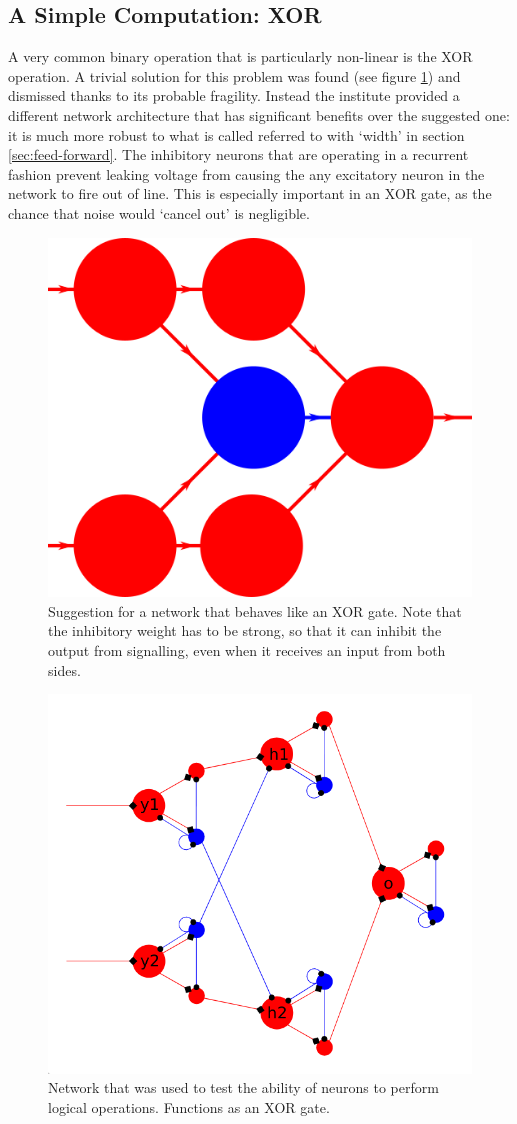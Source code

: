 \documentclass[a4paper,twocolumn]{article}
\begin{document}
\subsection{A Simple Computation: XOR}
A very common binary operation that is particularly non-linear is the XOR
operation\cite{horowitz_hill_2020}. A trivial solution for this problem was
found (see figure \ref{fig:XOR-suggested}) and dismissed thanks to its probable
fragility. Instead the institute provided a different network architecture that
has significant benefits over the suggested one: it is much more robust to what
is called referred to with `width' in section \ref{sec:feed-forward}. The
inhibitory neurons that are operating in a recurrent fashion prevent leaking
voltage from causing the any excitatory neuron in the network to fire out of
line. This is especially important in an XOR gate, as the chance that noise
would `cancel out' is negligible.

\begin{figure}
    \centering
    \includegraphics[width=.5\textwidth]{figures/XOR-suggested.png}
    \caption{Suggestion for a network that behaves like an XOR gate. Note that
        the inhibitory weight has to be strong, so that it can inhibit the output
        from signalling, even when it receives an input from both sides.}
    \label{fig:XOR-suggested}
\end{figure}

\begin{figure}
    \centering
    \includegraphics[width=.5\textwidth]{figures/XOR-used.png}
    \caption{Network that was used to test the ability of neurons to perform
        logical operations. Functions as an XOR gate.}
    \label{fig:XOR-used}
\end{figure}
\end{document}
